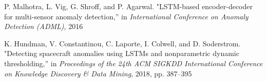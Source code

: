 \begin{thebibliography}{99}
P. Malhotra, L. Vig, G. Shroff, and P. Agarwal. "LSTM-based encoder-decoder for multi-sensor anomaly detection,'' in \textit{International Conference on Anomaly Detection (ADML)}, 2016

K. Hundman, V. Constantinou, C. Laporte, I. Colwell, and D. Soderstrom. "Detecting spacecraft anomalies using LSTMs and nonparametric dynamic thresholding,'' in \textit{Proceedings of the 24th ACM SIGKDD International Conference on Knowledge Discovery \& Data Mining}, 2018, pp. 387--395

\end{thebibliography}

% 
% 
% 
